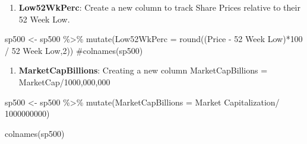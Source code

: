 \documentclass[
  letterpaper,
  DIV=11,
  numbers=noendperiod]{scrreport}
\newenvironment{Shaded}{\begin{snugshade}}{\end{snugshade}}
\newcommand{\AttributeTok}[1]{\textcolor[rgb]{0.40,0.45,0.13}{#1}}
\newcommand{\CommentTok}[1]{\textcolor[rgb]{0.37,0.37,0.37}{#1}}
\newcommand{\DecValTok}[1]{\textcolor[rgb]{0.68,0.00,0.00}{#1}}
\newcommand{\FunctionTok}[1]{\textcolor[rgb]{0.28,0.35,0.67}{#1}}
\newcommand{\NormalTok}[1]{\textcolor[rgb]{0.00,0.23,0.31}{#1}}
\newcommand{\OtherTok}[1]{\textcolor[rgb]{0.00,0.23,0.31}{#1}}
\newcommand{\SpecialCharTok}[1]{\textcolor[rgb]{0.37,0.37,0.37}{#1}}
\newcommand{\StringTok}[1]{\textcolor[rgb]{0.13,0.47,0.30}{#1}}
\providecommand{\tightlist}{%
  \setlength{\itemsep}{0pt}\setlength{\parskip}{0pt}}\usepackage{longtable,booktabs,array}
\begin{document}
\begin{enumerate}
\def\labelenumi{\arabic{enumi}.}
\tightlist
\item
  \textbf{Low52WkPerc}: Create a new column to track Share Prices
  relative to their 52 Week Low.
\end{enumerate}

\begin{Shaded}
\begin{Highlighting}[]
\NormalTok{sp500 }\OtherTok{\textless{}{-}}\NormalTok{ sp500 }\SpecialCharTok{\%\textgreater{}\%} \FunctionTok{mutate}\NormalTok{(}\AttributeTok{Low52WkPerc =} \FunctionTok{round}\NormalTok{((Price }\SpecialCharTok{{-}} \StringTok{\textasciigrave{}}\AttributeTok{52 Week Low}\StringTok{\textasciigrave{}}\NormalTok{)}\SpecialCharTok{*}\DecValTok{100} \SpecialCharTok{/} \StringTok{\textasciigrave{}}\AttributeTok{52 Week Low}\StringTok{\textasciigrave{}}\NormalTok{,}\DecValTok{2}\NormalTok{))}
\CommentTok{\#colnames(sp500)}
\end{Highlighting}
\end{Shaded}

\begin{enumerate}
\def\labelenumi{\arabic{enumi}.}
\setcounter{enumi}{1}
\tightlist
\item
  \textbf{MarketCapBillions}: Creating a new column MarketCapBillions =
  MarketCap/1000,000,000
\end{enumerate}

\begin{Shaded}
\begin{Highlighting}[]
\NormalTok{sp500 }\OtherTok{\textless{}{-}}\NormalTok{ sp500 }\SpecialCharTok{\%\textgreater{}\%} \FunctionTok{mutate}\NormalTok{(}\AttributeTok{MarketCapBillions =} \StringTok{\textasciigrave{}}\AttributeTok{Market Capitalization}\StringTok{\textasciigrave{}}\SpecialCharTok{/} \DecValTok{1000000000}\NormalTok{)}
\end{Highlighting}
\end{Shaded}

\begin{Shaded}
\begin{Highlighting}[]
\FunctionTok{colnames}\NormalTok{(sp500)}
\end{Highlighting}
\end{Shaded}
\end{document}
